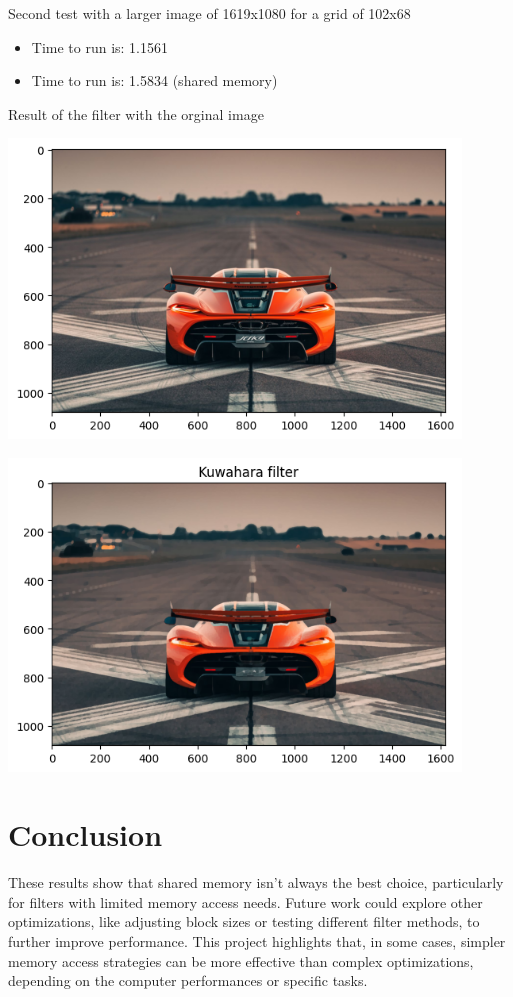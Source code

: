 \documentclass{article}
\begin{document}
Second test with a larger image of 1619x1080 for a grid of 102x68

\begin{itemize}
    \item Time to run is: 1.1561
    \item Time to run is: 1.5834 (shared memory)
\end{itemize}

Result of the filter with the orginal image


\includegraphics[width=0.9\textwidth]{jesko_plt.png}


\includegraphics[width=0.9\textwidth]{jesko_plt_kuwahara.png}

\section{Conclusion}

These results show that shared memory isn't always the best choice, particularly for filters with limited memory access needs. Future work could explore other optimizations, like adjusting block sizes or testing different filter methods, to further improve performance. This project highlights that, in some cases, simpler memory access strategies can be more effective than complex optimizations, depending on the computer performances or specific tasks. 
\end{document}

